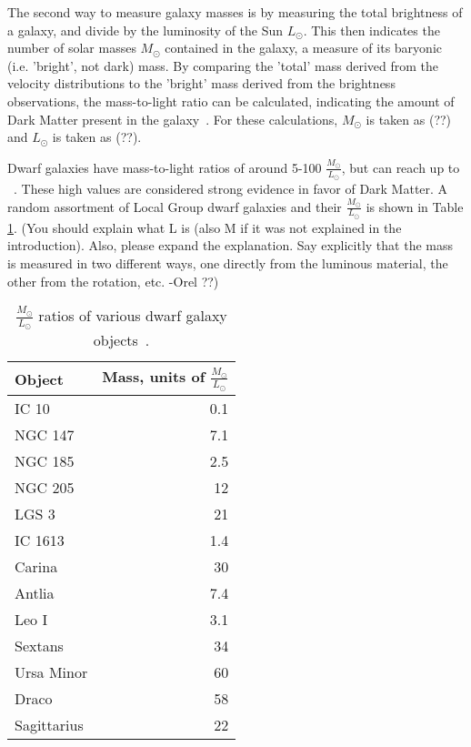     The second way to measure galaxy masses is by measuring the total brightness of a galaxy, and divide by the luminosity of the Sun $L_\odot$.
    This then indicates the number of solar masses $M_\odot$ contained in the galaxy, a measure of its baryonic (i.e. 'bright', not dark) mass.
    By comparing the 'total' mass derived from the velocity distributions to the 'bright' mass derived from the brightness observations, the mass-to-light ratio can be calculated, indicating the amount of Dark Matter present in the galaxy~\cite{faber_ml}.
    For these calculations, $M_\odot$ is taken as {\color{red}(??)} and $L_\odot$ is taken as {\color{red}(??)}.
    
    Dwarf galaxies have mass-to-light ratios of around 5-100 $\frac{M_\odot}{L_\odot}$, but can reach up to ~\cite{Simon2007_dwarfgalaxykeck}.
    These high values are considered strong evidence in favor of Dark Matter.
    A random assortment of Local Group dwarf galaxies and their $\frac{M_\odot}{L_\odot}$ is shown in Table \ref{tab:mlratios:dwarfgals}.
    {\color{red}(You should explain what L is (also M if it was not explained in the introduction).  Also, please expand the explanation. Say explicitly that the mass is measured in two different ways, one directly from the luminous material, the other from the rotation, etc. -Orel ??)}
    
    \begin{table}[]
      \centering
      \caption{$\frac{M_\odot}{L_\odot}$ ratios of various dwarf galaxy objects~\cite{localdwarfs}.}
      \label{tab:mlratios:dwarfgals}
      \begin{tabular}{l r}
        Object      &  Mass, units of $\frac{M_\odot}{L_\odot}$ \\
        \hline
        IC 10       &  0.1 \\
        NGC 147     &  7.1 \\
        NGC 185     &  2.5 \\
        NGC 205     & 12   \\
        LGS 3       & 21   \\
        IC 1613     &  1.4 \\
        Carina      & 30   \\
        Antlia      &  7.4 \\
        Leo I       &  3.1 \\
        Sextans     & 34   \\
        Ursa Minor  & 60   \\
        Draco       & 58   \\
        Sagittarius & 22   \\
      \end{tabular}
    \end{table}
    

